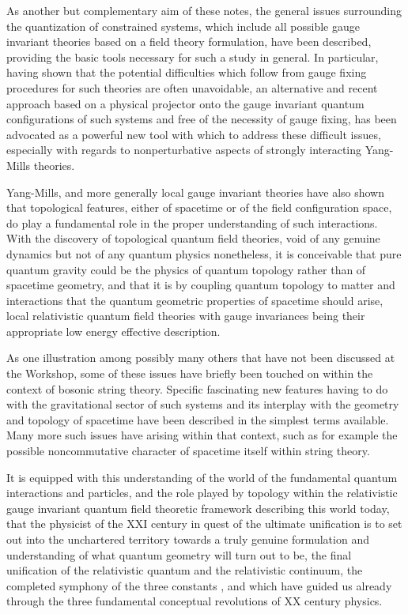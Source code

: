 \documentclass[a4paper,11pt]{article}
\begin{document}
As another but complementary aim of these notes, the general issues surrounding
the quantization of constrained systems, which include all possible gauge
invariant theories based on a field theory formulation, have been described,
providing the basic tools necessary for such a study in general. In particular,
having shown that the potential difficulties which follow from gauge fixing
procedures for such theories are often unavoidable, an alternative and recent
approach based on a physical projector\cite{Klaud1} onto the gauge invariant 
quantum configurations of such systems and free of the necessity of gauge 
fixing, has been advocated as a powerful new tool with which to address these 
difficult issues, especially with regards to nonperturbative aspects of 
strongly interacting Yang-Mills theories.

Yang-Mills, and more generally local gauge invariant theories have also
shown that topological features, either of spacetime or of the field
configuration space, do play a fundamental role in the proper understanding
of such interactions. With the discovery of topological quantum field 
theories,\cite{Wit1,Wit2,Wit3} void of any genuine dynamics but not of any 
quantum physics nonetheless, it is conceivable that pure quantum gravity 
could be the physics of quantum to\-po\-lo\-gy rather than of spacetime 
geometry, and that it is by coupling quantum topology to matter and 
interactions that the quantum geometric properties of spacetime should arise,
local relativistic quantum field theories with gauge invariances being
their appropriate low energy effective description.

As one illustration among possibly many others that have not been
discussed at the Workshop, some of these issues have briefly been
touched on within the context of bosonic string theory. Specific 
fascinating new features having to do with the gravitational sector
of such systems and its interplay with the geometry and topology of spacetime
have been described in the simplest terms available. Many more such
issues have arising within that context, such as for example the possible
noncommutative character of spacetime itself within string theory.\cite{SW}

It is equipped with this understanding of the world of the fundamental
quantum interactions and particles, and the role played by topology
within the relativistic gauge invariant quantum field theoretic framework 
describing this world today, that the physicist of the XXI\coordHE{} century
in quest of the ultimate unification is to set out into the unchartered
territory towards a truly genuine formulation and understanding of what
quantum geometry will turn out to be, the final unification of the 
relativistic quantum and the relativistic continuum, the completed 
symphony of the three constants \coordHE{}, \myHighlight{$\hbar$}\coordHE{} and \coordHE{} which have guided us 
already through the three fundamental conceptual revolutions of 
XX\coordHE{} century physics.
\end{document}
